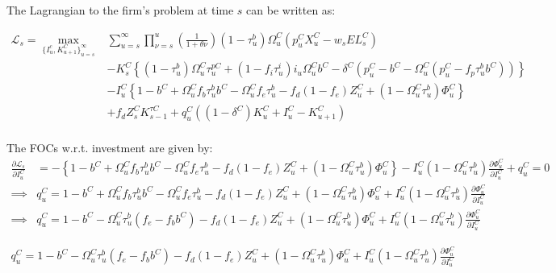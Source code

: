 The Lagrangian to the firm's problem at time $s$ can be written as:

 \begin{equation}
\label{eqn:lagrangian}
\begin{split}
\mathcal{L}_{s} = \max_{\{I^{c}_{u},K^{C}_{u+1}\}^{\infty}_{u=s}} &  \sum_{u=s}^{\infty} \prod_{\nu=s}^{u}\left(\frac{1}{1+\theta{\nu}}\right) (1-\tau^{b}_{u})\Omega^{C}_{u}(p^{C}_{u}X^{C}_{u}-w_{s}EL^{C}_{s})  \\ 
 & - K^{C}_{s} \left\{(1-\tau^{b}_{u})\Omega^{C}_{u}\tau^{pC}_{u}+(1-f_{i}\tau^{i}_{u})i_{u}\Omega^{C}_{u}b^{C}-\delta^{C}(p^{C}_{u}-b^{C}-\Omega^{C}_{u}(p^{C}_{u}-f_{p}\tau^{b}_{u}b^{C}))\right\}  \\
 & - I^{C}_{u}\left\{1-b^{C}+\Omega^{C}_{u}f_{b}\tau^{b}_{u}b^{C}-\Omega^{C}_{u}f_{e}\tau^{b}_{u} - f_{d}(1-f_{e})Z^{C}_{u} + (1-\Omega^{C}_{u}\tau^{b}_{u})\Phi^{C}_{u}\right\} \\
 &  + f_{d}Z^{C}_{s}K^{\tau C}_{s-1} + q^{C}_{u}((1-\delta^{C})K^{C}_{u} + I^{C}_{u}-K^{C}_{u+1})\\
\end{split}
\end{equation}

The FOCs w.r.t. investment are given by:
 \begin{equation}
\label{eqn:foc_i}
\begin{split}
\frac{\partial \mathcal{L}_{s}}{\partial I^{C}_{u}} & = -\left\{1-b^{C}+\Omega^{C}_{u}f_{b}\tau^{b}_{u}b^{C}-\Omega^{C}_{u}f_{e}\tau^{b}_{u} - f_{d}(1-f_{e})Z^{C}_{u} + (1-\Omega^{C}_{u}\tau^{b}_{u})\Phi^{C}_{u}\right\} - I^{C}_{u}(1-\Omega^{C}_{u}\tau^{b}_{u})\frac{\partial \Phi^{C}_{u}}{\partial I^{C}_{u}} + q^{C}_{u} = 0 \\
\implies & q^{C}_{u}  = 1-b^{C}+\Omega^{C}_{u}f_{b}\tau^{b}_{u}b^{C}-\Omega^{C}_{u}f_{e}\tau^{b}_{u} - f_{d}(1-f_{e})Z^{C}_{u} + (1-\Omega^{C}_{u}\tau^{b}_{u})\Phi^{C}_{u} +  I^{C}_{u}(1-\Omega^{C}_{u}\tau^{b}_{u})\frac{\partial \Phi^{C}_{u}}{\partial I^{C}_{u}} \\
\implies & q^{C}_{u}  = 1-b^{C}-\Omega^{C}_{u}\tau^{b}_{u}(f_{e}-f_{b}b^{C}) - f_{d}(1-f_{e})Z^{C}_{u} + (1-\Omega^{C}_{u}\tau^{b}_{u})\Phi^{C}_{u} +  I^{C}_{u}(1-\Omega^{C}_{u}\tau^{b}_{u})\frac{\partial \Phi^{C}_{u}}{\partial I^{C}_{u}} 
\end{split}
\end{equation}

 \begin{equation}
\label{eqn:opt_i}
\begin{split}
 q^{C}_{u}  = 1-b^{C}-\Omega^{C}_{u}\tau^{b}_{u}(f_{e}-f_{b}b^{C}) - f_{d}(1-f_{e})Z^{C}_{u} + (1-\Omega^{C}_{u}\tau^{b}_{u})\Phi^{C}_{u} +  I^{C}_{u}(1-\Omega^{C}_{u}\tau^{b}_{u})\frac{\partial \Phi^{C}_{u}}{\partial I^{C}_{u}} 
\end{split}
\end{equation}

